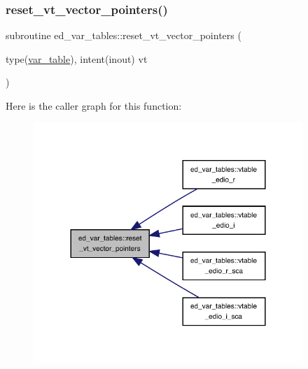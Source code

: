 \subsubsection{\texorpdfstring{reset\+\_\+vt\+\_\+vector\+\_\+pointers()}{reset\_vt\_vector\_pointers()}}
{\footnotesize\ttfamily subroutine ed\+\_\+var\+\_\+tables\+::reset\+\_\+vt\+\_\+vector\+\_\+pointers (\begin{DoxyParamCaption}\item[{type(\hyperlink{structed__var__tables_1_1var__table}{var\+\_\+table}), intent(inout)}]{vt }\end{DoxyParamCaption})}

Here is the caller graph for this function\+:
\nopagebreak
\begin{figure}[H]
\begin{center}
\leavevmode
\includegraphics[width=288pt]{namespaceed__var__tables_aed76c1293872b5f6cf4c39c0747d2bb4_icgraph}
\end{center}
\end{figure}
\mbox{\label{namespaceed__var__tables_ab691217cef9253738e526499e054a9d1}} 
